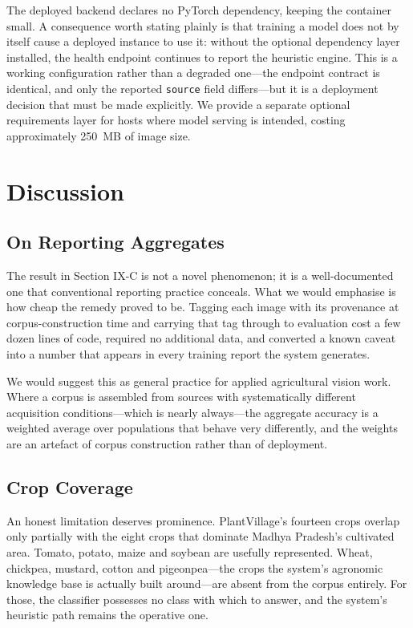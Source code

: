 \documentclass[conference]{IEEEtran}
\begin{document}
The deployed backend declares no PyTorch dependency, keeping the container
small. A consequence worth stating plainly is that training a model does not by
itself cause a deployed instance to use it: without the optional dependency
layer installed, the health endpoint continues to report the heuristic engine.
This is a working configuration rather than a degraded one---the endpoint
contract is identical, and only the reported \texttt{source} field differs---but
it is a deployment decision that must be made explicitly. We provide a separate
optional requirements layer for hosts where model serving is intended,
costing approximately 250~MB of image size.

\section{Discussion}

\subsection{On Reporting Aggregates}

The result in Section IX-C is not a novel phenomenon; it is a well-documented
one that conventional reporting practice conceals. What we would emphasise is
how cheap the remedy proved to be. Tagging each image with its provenance at
corpus-construction time and carrying that tag through to evaluation cost a few
dozen lines of code, required no additional data, and converted a known caveat
into a number that appears in every training report the system generates.

We would suggest this as general practice for applied agricultural vision work.
Where a corpus is assembled from sources with systematically different
acquisition conditions---which is nearly always---the aggregate accuracy is a
weighted average over populations that behave very differently, and the weights
are an artefact of corpus construction rather than of deployment.

\subsection{Crop Coverage}

An honest limitation deserves prominence. PlantVillage's fourteen crops
overlap only partially with the eight crops that dominate Madhya Pradesh's
cultivated area. Tomato, potato, maize and soybean are usefully represented.
Wheat, chickpea, mustard, cotton and pigeonpea---the crops the system's
agronomic knowledge base is actually built around---are absent from the corpus
entirely. For those, the classifier possesses no class with which to answer,
and the system's heuristic path remains the operative one.
\end{document}
